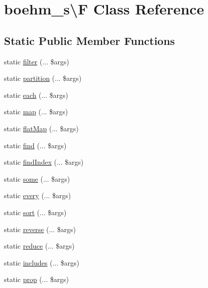 \hypertarget{classboehm__s_1_1F}{}\section{boehm\+\_\+s\textbackslash{}F Class Reference}
\label{classboehm__s_1_1F}
\subsection*{Static Public Member Functions}
\begin{DoxyCompactItemize}
\item 
static \hyperlink{classboehm__s_1_1F_a80fe06fb52d10a68a0d6b36ca821463f}{filter} (... \$args)
\item 
static \hyperlink{classboehm__s_1_1F_aa5978174a7fe6498a561ee7ea4262f7b}{partition} (... \$args)
\item 
static \hyperlink{classboehm__s_1_1F_adf594aee11edbf796efae99d00dc8f46}{each} (... \$args)
\item 
static \hyperlink{classboehm__s_1_1F_a5b9016a3452e48e05c20c3ca94e5b4e8}{map} (... \$args)
\item 
static \hyperlink{classboehm__s_1_1F_a92bf70afadb55e6b39bad69909c6e697}{flat\+Map} (... \$args)
\item 
static \hyperlink{classboehm__s_1_1F_a68db344c2eabeb0f3139ec3000a8b039}{find} (... \$args)
\item 
static \hyperlink{classboehm__s_1_1F_a385a847258b151462eb4fa8e6e06a069}{find\+Index} (... \$args)
\item 
static \hyperlink{classboehm__s_1_1F_aee63ff04d9ecde792865a5435a6e8cc9}{some} (... \$args)
\item 
static \hyperlink{classboehm__s_1_1F_a559bfb165c4ec768a49830173fa709e3}{every} (... \$args)
\item 
static \hyperlink{classboehm__s_1_1F_a742910125ee71afd3149a16262506600}{sort} (... \$args)
\item 
static \hyperlink{classboehm__s_1_1F_a560daa6ae48b7a41c82c6e42e747ec6a}{reverse} (... \$args)
\item 
static \hyperlink{classboehm__s_1_1F_a110a6463a6551b88915ed3ce87d56fb3}{reduce} (... \$args)
\item 
static \hyperlink{classboehm__s_1_1F_aa695a4a8ea655ab5d7011f205eb49de7}{includes} (... \$args)
\item 
static \hyperlink{classboehm__s_1_1F_a6c075d73d686e5bb71456a03e13d6d16}{prop} (... \$args)
\item 

\end{DoxyCompactItemize}
